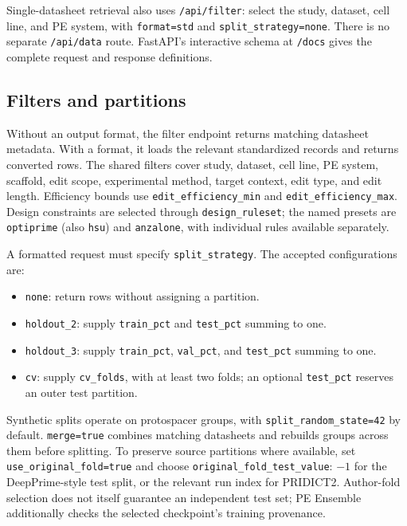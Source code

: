 \documentclass{article}
\begin{document}
Single-datasheet retrieval also uses \nolinkurl{/api/filter}: select the study, dataset, cell line, and PE system, with \nolinkurl{format=std} and \nolinkurl{split_strategy=none}. There is no separate \nolinkurl{/api/data} route. FastAPI's interactive schema at \nolinkurl{/docs} gives the complete request and response definitions.

\subsection{Filters and partitions}

Without an output format, the filter endpoint returns matching datasheet metadata. With a format, it loads the relevant standardized records and returns converted rows. The shared filters cover study, dataset, cell line, PE system, scaffold, edit scope, experimental method, target context, edit type, and edit length. Efficiency bounds use \nolinkurl{edit_efficiency_min} and \nolinkurl{edit_efficiency_max}. Design constraints are selected through \nolinkurl{design_ruleset}; the named presets are \nolinkurl{optiprime} (also \nolinkurl{hsu}) and \nolinkurl{anzalone}, with individual rules available separately.

A formatted request must specify \nolinkurl{split_strategy}. The accepted configurations are:

\begin{itemize}
    \item \nolinkurl{none}: return rows without assigning a partition.
    \item \nolinkurl{holdout_2}: supply \nolinkurl{train_pct} and \nolinkurl{test_pct} summing to one.
    \item \nolinkurl{holdout_3}: supply \nolinkurl{train_pct}, \nolinkurl{val_pct}, and \nolinkurl{test_pct} summing to one.
    \item \nolinkurl{cv}: supply \nolinkurl{cv_folds}, with at least two folds; an optional \nolinkurl{test_pct} reserves an outer test partition.
\end{itemize}

Synthetic splits operate on protospacer groups, with \nolinkurl{split_random_state=42} by default. \nolinkurl{merge=true} combines matching datasheets and rebuilds groups across them before splitting. To preserve source partitions where available, set \nolinkurl{use_original_fold=true} and choose \nolinkurl{original_fold_test_value}: $-1$ for the DeepPrime-style test split, or the relevant run index for PRIDICT2. Author-fold selection does not itself guarantee an independent test set; PE Ensemble additionally checks the selected checkpoint's training provenance.
\end{document}
